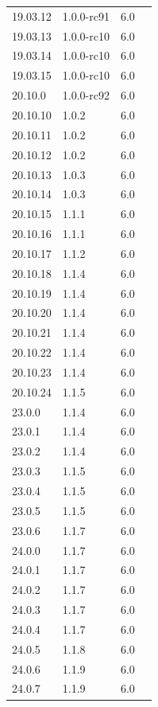 \documentclass[12pt]{report}
\newcommand{\cmark}{\ding{51}} %
\begin{document}
\begin{doublespace}
{\begin{longtable}{|p{4cm}|p{3cm}||p{3cm}|p{2cm}|}
19.03.12 & 1.0.0-rc91 & 6.0 & \cmark \\
19.03.13 & 1.0.0-rc10 & 6.0 & \cmark \\
19.03.14 & 1.0.0-rc10 & 6.0 & \cmark \\
19.03.15 & 1.0.0-rc10 & 6.0 & \cmark \\
20.10.0 & 1.0.0-rc92 & 6.0 & \cmark \\
20.10.10 & 1.0.2 & 6.0 & \cmark \\
20.10.11 & 1.0.2 & 6.0 & \cmark \\
20.10.12 & 1.0.2 & 6.0 & \cmark \\
20.10.13 & 1.0.3 & 6.0 & \cmark \\
20.10.14 & 1.0.3 & 6.0 & \cmark \\
20.10.15 & 1.1.1 & 6.0 & \cmark \\
20.10.16 & 1.1.1 & 6.0 & \cmark \\
20.10.17 & 1.1.2 & 6.0 & \cmark \\
20.10.18 & 1.1.4 & 6.0 & \cmark \\
20.10.19 & 1.1.4 & 6.0 & \cmark \\
20.10.20 & 1.1.4 & 6.0 & \cmark \\
20.10.21 & 1.1.4 & 6.0 & \cmark \\
20.10.22 & 1.1.4 & 6.0 & \cmark \\
20.10.23 & 1.1.4 & 6.0 & \cmark \\
20.10.24 & 1.1.5 & 6.0 & \cmark \\
23.0.0 & 1.1.4 & 6.0 & \cmark \\
23.0.1 & 1.1.4 & 6.0 & \cmark \\
23.0.2 & 1.1.4 & 6.0 & \cmark \\
23.0.3 & 1.1.5 & 6.0 & \cmark \\
23.0.4 & 1.1.5 & 6.0 & \cmark \\
23.0.5 & 1.1.5 & 6.0 & \cmark \\
23.0.6 & 1.1.7 & 6.0 & \cmark \\
24.0.0 & 1.1.7 & 6.0 & \cmark \\
24.0.1 & 1.1.7 & 6.0 & \cmark \\
24.0.2 & 1.1.7 & 6.0 & \cmark \\
24.0.3 & 1.1.7 & 6.0 & \cmark \\
24.0.4 & 1.1.7 & 6.0 & \cmark \\
24.0.5 & 1.1.8 & 6.0 & \cmark \\
24.0.6 & 1.1.9 & 6.0 & \cmark \\
24.0.7 & 1.1.9 & 6.0 & \cmark \\

\end{longtable}}
\end{doublespace}
\end{document}
